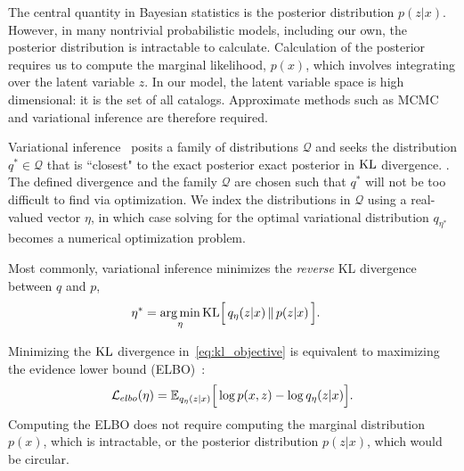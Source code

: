 The central quantity in Bayesian statistics is the posterior distribution $p(z|x)$.
However, in many
nontrivial probabilistic models, including our own, the posterior distribution is intractable to calculate.
Calculation of the posterior requires us to compute the marginal likelihood, $p(x)$, which involves integrating over the latent variable $z$.
In our model, the latent variable space is high dimensional: it is the set of all catalogs. Approximate methods such as MCMC and variational inference are therefore required.

Variational inference~\citep{Jordan_intro_vi, Wainwrite_graph_models_vi, Blei_2017_vi_review} posits a family of distributions $\mathcal{Q}$ and seeks
the distribution $q^*\in \mathcal{Q}$ that is ``closest" to the exact posterior
exact posterior in $\textrm{KL}$ divergence. .
The defined divergence and the family $\mathcal{Q}$ are chosen such that $q^*$ will
not be too difficult to find via optimization.
We index the distributions in $\mathcal{Q}$ using a real-valued vector $\eta$, in which
case solving for the optimal variational distribution $q_{\eta^*}$
becomes a numerical optimization problem.

%
Most commonly, variational inference minimizes the \textit{reverse} KL divergence
between $q$ and $p$,
\begin{align}
   \eta^* &= \operatorname*{arg\,min}_{\eta} \mathrm{KL}\Big[\,q_\eta(z | x)\, \| \,p(z | x)\,\Big].
   \label{eq:kl_objective}
\end{align}

Minimizing the $\textrm{KL}$ divergence in~\eqref{eq:kl_objective} is equivalent to maximizing the evidence lower bound (ELBO)~\citep{Blei_2017_vi_review}:
\begin{align}
    \mathcal{L}_{elbo}(\eta) =
    \mathbb{E}_{q_\eta(z | x)}\Big[\log p(x, z) - \log q_\eta(z | x)\Big].
    \label{eq:elbo}
\end{align}
Computing the ELBO does not require computing the marginal distribution $p(x)$, which is intractable, or the posterior distribution $p(z | x)$, which would be circular.


